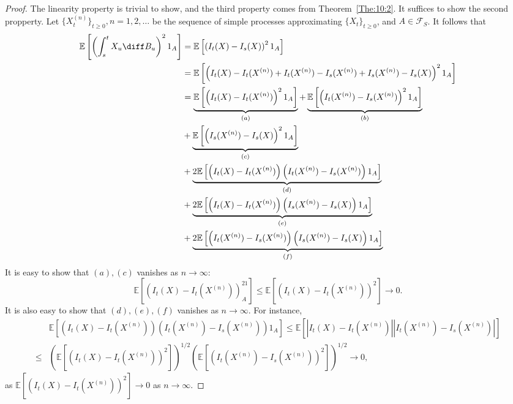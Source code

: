 \begin{proof}
The linearity property is trivial to show, and the third property comes from Theorem~\ref{The:10:2}.
It suffices to show the second propperty.
Let $\{X_t^{(n)}\}_{t\ge0}, n=1,2,\ldots$ be the sequence of simple processes approximating $\{X_t\}_{t\ge0}$, and $A\in\mathcal{F}_S$.
It follows that
\begin{align*}
\mathbb{E}\left[
\left(
\int_s^tX_u\diff B_u
\right)^21_A
\right]&=\mathbb{E}\left[
\left(
I_t(X)-I_s(X)
\right)^21_A
\right]\\
&=\mathbb{E}\left[
\left(
I_t(X)-I_t(X^{(n)})+I_t(X^{(n)})-I_s(X^{(n)})+I_s(X^{(n)})-I_s(X)
\right)^21_A
\right]\\
&=\underbrace{\mathbb{E}\left[
\left(
I_t(X)-I_t(X^{(n)})
\right)^21_A
\right]}_{(a)}+
\underbrace{\mathbb{E}\left[
\left(
I_t(X^{(n)})-I_s(X^{(n)})
\right)^21_A
\right]}_{(b)}
\\&+
\underbrace{\mathbb{E}\left[
\left(
I_s(X^{(n)})-I_s(X)
\right)^21_A
\right]}_{(c)}\\
&+\underbrace{2\mathbb{E}\left[
\left(
I_t(X)-I_t(X^{(n)})
\right)\left(
I_t(X^{(n)})-I_s(X^{(n)})
\right)1_A
\right]}_{(d)}\\
&+\underbrace{2\mathbb{E}\left[
\left(
I_t(X)-I_t(X^{(n)})
\right)\left(
I_s(X^{(n)})-I_s(X)
\right)1_A
\right]}_{(e)}\\
&+\underbrace{2\mathbb{E}\left[
\left(
I_t(X^{(n)})-I_s(X^{(n)})
\right)\left(
I_s(X^{(n)})-I_s(X)
\right)1_A
\right]}_{(f)}
\end{align*}
It is easy to show that $(a),(c)$ vanishes as $n\to\infty$:
\[
\mathbb{E}\left[
\left(
I_t(X)-I_t(X^{(n)})
\right)^21_A
\right]\le 
\mathbb{E}\left[
\left(
I_t(X)-I_t(X^{(n)})
\right)^2
\right]\to0.
\]
It is also easy to show that $(d),(e),(f)$ vanishes as $n\to\infty$. For instance,
\begin{align*}
&\mathbb{E}\left[
\left(
I_t(X)-I_t(X^{(n)})
\right)\left(
I_t(X^{(n)})-I_s(X^{(n)})
\right)1_A
\right]
\le \mathbb{E}\left[
\left|
I_t(X)-I_t(X^{(n)})
\right|\left|
I_t(X^{(n)})-I_s(X^{(n)})
\right|
\right]\\
\le& \left(
 \mathbb{E}\left[
(
I_t(X)-I_t(X^{(n)})
)^2
\right]
\right)^{1/2}
\left(
 \mathbb{E}\left[
(
I_t(X^{(n)})-I_s(X^{(n)})
)^2
\right]
\right)^{1/2}\to0,
\end{align*}
as $ \mathbb{E}\left[
(
I_t(X)-I_t(X^{(n)})
)^2
\right]\to0$ as $n\to\infty$.


\end{proof}
